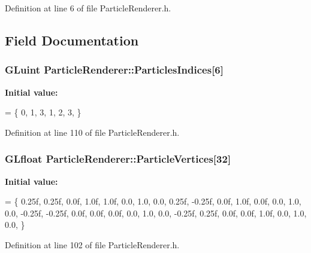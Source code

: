 Definition at line 6 of file Particle\+Renderer.\+h.



\subsection{Field Documentation}
\subsubsection[{\texorpdfstring{Particles\+Indices}{ParticlesIndices}}]{\setlength{\rightskip}{0pt plus 5cm}G\+Luint Particle\+Renderer\+::\+Particles\+Indices\mbox{[}6\mbox{]}\hspace{0.3cm}{\ttfamily [private]}}\hypertarget{class_particle_renderer_afcb1a06e978086291d76288d29ca5015}{}\label{class_particle_renderer_afcb1a06e978086291d76288d29ca5015}
{\bfseries Initial value\+:}
\begin{DoxyCode}
=
    \{
        0, 1, 3,
        1, 2, 3,
    \}
\end{DoxyCode}


Definition at line 110 of file Particle\+Renderer.\+h.

\subsubsection[{\texorpdfstring{Particle\+Vertices}{ParticleVertices}}]{\setlength{\rightskip}{0pt plus 5cm}G\+Lfloat Particle\+Renderer\+::\+Particle\+Vertices\mbox{[}32\mbox{]}\hspace{0.3cm}{\ttfamily [private]}}\hypertarget{class_particle_renderer_a5d656611858354276ac560ac41c751ba}{}\label{class_particle_renderer_a5d656611858354276ac560ac41c751ba}
{\bfseries Initial value\+:}
\begin{DoxyCode}
=
    \{
        0.25f,  0.25f,  0.0f, 1.0f, 1.0f, 0.0, 1.0, 0.0,
        0.25f, -0.25f,  0.0f, 1.0f, 0.0f, 0.0, 1.0, 0.0,
        -0.25f, -0.25f,  0.0f, 0.0f, 0.0f, 0.0, 1.0, 0.0,
        -0.25f,  0.25f,  0.0f, 0.0f, 1.0f, 0.0, 1.0, 0.0,
    \}
\end{DoxyCode}


Definition at line 102 of file Particle\+Renderer.\+h.

